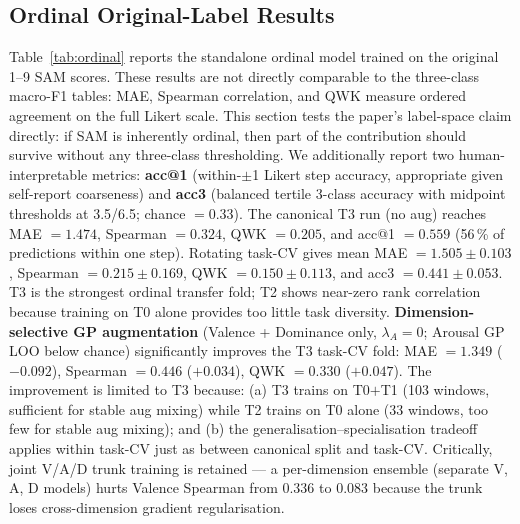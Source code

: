 \documentclass[sigconf,review,anonymous]{acmart}
\begin{document}
\subsection{Ordinal Original-Label Results}
\label{sec:ordinal_results}

Table~\ref{tab:ordinal} reports the standalone ordinal model trained on the
original 1--9 SAM scores.  These results are not directly comparable to the
three-class macro-F1 tables: MAE, Spearman correlation, and QWK measure ordered
agreement on the full Likert scale.
This section tests the paper's label-space claim directly:
if SAM is inherently ordinal, then part of the contribution should survive
without any three-class thresholding.
We additionally report two human-interpretable metrics:
\textbf{acc@1} (within-$\pm$1 Likert step accuracy, appropriate given
self-report coarseness) and \textbf{acc3} (balanced tertile 3-class accuracy
with midpoint thresholds at 3.5/6.5; chance $= 0.33$).
The canonical T3 run (no aug) reaches MAE $=1.474$, Spearman $=0.324$, QWK $=0.205$,
and acc@1 $=0.559$ (56\,\% of predictions within one step).
Rotating task-CV gives mean MAE $=1.505 \pm 0.103$, Spearman $=0.215 \pm 0.169$,
QWK $=0.150 \pm 0.113$, and acc3 $=0.441 \pm 0.053$.
T3 is the strongest ordinal transfer fold; T2 shows near-zero rank correlation
because training on T0 alone provides too little task diversity.
\textbf{Dimension-selective GP augmentation} (Valence + Dominance only,
$\lambda_A{=}0$; Arousal GP LOO below chance) significantly improves the T3 task-CV fold:
MAE $=1.349$ ($-0.092$), Spearman $=0.446$ ($+0.034$), QWK $=0.330$ ($+0.047$).
The improvement is limited to T3 because: (a) T3 trains on T0$+$T1 (103 windows,
sufficient for stable aug mixing) while T2 trains on T0 alone (33 windows,
too few for stable aug mixing); and (b) the generalisation--specialisation tradeoff
applies within task-CV just as between canonical split and task-CV.
Critically, joint V/A/D trunk training is retained --- a per-dimension ensemble
(separate V, A, D models) hurts Valence Spearman from $0.336$ to $0.083$
because the trunk loses cross-dimension gradient regularisation.
\end{document}
